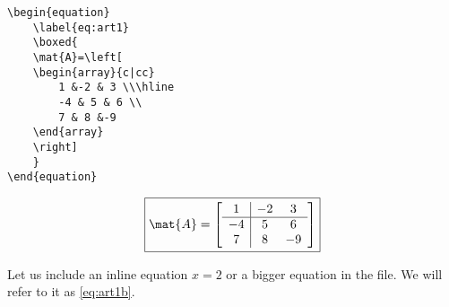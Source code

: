 \begin{SBN}
\color{blue}
\begin{verbatim}
\begin{equation}
	\label{eq:art1}
	\boxed{	
	\mat{A}=\left[
	\begin{array}{c|cc}
		1 &-2 & 3 \\\hline
		-4 & 5 & 6 \\
		7 & 8 &-9
	\end{array} 
	\right]
	}
\end{equation}
\end{verbatim}
\end{SBN}

\begin{equation}
	\label{eq:art1b}
	\boxed{
	\mat{A}=\left[
	\begin{array}{c|cc}
		1 &-2 & 3 \\\hline
		-4 & 5 & 6 \\
		7 & 8 &-9
	\end{array} 
	\right]
	}
\end{equation}


Let us include an inline equation $x=2$ or a bigger equation in the file. We will refer to it as \eqref{eq:art1b}.

